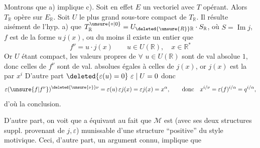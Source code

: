 
 Montrons que a) implique c). Soit en
effet  $E$ un vectoriel  avec $T$ opérant.
Alors $T_{\mathbb R}$ opère sur $E_{\mathbb R}$. Soit $U$ le plus
grand sous-tore compact de $T_{\mathbb R}$. Il résulte
aisément de l'hyp. a) que $T_{\mathbb R}^{\unsure{\circ|0}}=U_{\deleted{\unsure{R}}\mathbb R}\cdot S_{\mathbb R}$,
où $S=\operatorname{Im}j$,   $f$ est de la forme
$u\,j(x)$, ou du moins il existe un entier 
que
\[
f^\nu=u\cdot j(x)\qquad u\in U(\mathbb R),\quad x\in\mathbb R^*
\]
Or $U$ étant compact, les valeurs propres de $\forall$
$u\in U(\mathbb R)$ sont de val absolue $1$, donc celles
de $f^\nu$ sont de val. absolues égales à celles
de $j(x)$, or $j(x)$ est la   par
$x^i$ \unsure{,} 
D'autre part $\deleted{\varepsilon(u)=0}\ \varepsilon\mid U=0$ donc
\[
\varepsilon(\unsure{f|f^\nu})^{\deleted{\unsure{\nu}}\nu}=\varepsilon(u)\,\varepsilon j(x)=\varepsilon j(x)=x^\alpha,\qquad
\text{donc}\quad x^{i/\nu}=\varepsilon(f)^{i/\alpha}=q^{i/\alpha},
\]
d'où la conclusion.


D'autre part, on voit que a équivaut au
fait que $\mathcal M$ est (avec ses deux structures suppl.
provenant de $j,\varepsilon$) munissable d'une structure
``positive'' du style motivique. Ceci, d'autre part,
 un argument connu, implique que

